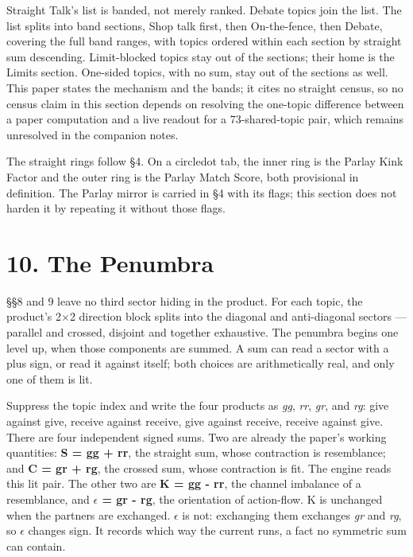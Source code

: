 Straight Talk's list is banded, not merely ranked. Debate topics join
the list. The list splits into band sections, Shop talk first, then
On-the-fence, then Debate, covering the full band ranges, with topics
ordered within each section by straight sum descending. Limit-blocked
topics stay out of the sections; their home is the Limits section.
One-sided topics, with no sum, stay out of the sections as well. This
paper states the mechanism and the bands; it cites no straight census,
so no census claim in this section depends on resolving the one-topic
difference between a paper computation and a live readout for a
73-shared-topic pair, which remains unresolved in the companion notes.

The straight rings follow \S 4. On a circledot tab, the inner ring is the
Parlay Kink Factor and the outer ring is the Parlay Match Score, both
provisional in definition. The Parlay mirror is carried in \S 4 with its
flags; this section does not harden it by repeating it without those
flags.

\section{10. The Penumbra}\label{the-penumbra}

\S \S 8 and 9 leave no third sector hiding in the product. For each topic,
the product's 2$\times$2 direction block splits into the diagonal and
anti-diagonal sectors --- parallel and crossed, disjoint and together
exhaustive. The penumbra begins one level up, when those components are
summed. A sum can read a sector with a plus sign, or read it against
itself; both choices are arithmetically real, and only one of them is
lit.

Suppress the topic index and write the four products as \emph{gg},
\emph{rr}, \emph{gr}, and \emph{rg}: give against give, receive against
receive, give against receive, receive against give. There are four
independent signed sums. Two are already the paper's working quantities:
\textbf{S = gg + rr}, the straight sum, whose contraction is
resemblance; and \textbf{C = gr + rg}, the crossed sum, whose
contraction is fit. The engine reads this lit pair. The other two are
\textbf{K = gg - rr}, the channel imbalance of a resemblance, and
\textbf{$\epsilon$ = gr - rg}, the orientation of action-flow. K is unchanged
when the partners are exchanged. $\epsilon$ is not: exchanging them exchanges
\emph{gr} and \emph{rg}, so $\epsilon$ changes sign. It records which way the
current runs, a fact no symmetric sum can contain.

